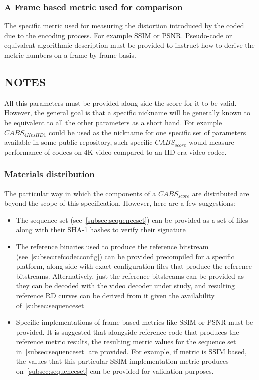 \documentclass[10pt, conference, hidelinks, onecolumn]{IEEEtran}
\begin{document}
\subsubsection{A Frame based metric used for comparison}
\label{subsec:framebasemetric}
The specific metric used for measuring the distortion introduced by the coded due to the encoding process. For example SSIM or PSNR. Pseudo-code or equivalent algorithmic description must be provided to instruct how to derive the metric numbers on a frame by frame basis.

\subsection{NOTES}
All this parameters must be provided along side the score for it to be valid. However, the general goal is that a specific nickname will be generally known to be equivalent to all the other parameters as a short hand. For example $CABS_{4KvsHD1}$ could be used as the nickname for one specific set of parameters available in some public repository, such specific $CABS_{score}$ would measure performance of codecs on 4K video compared to an HD era video codec.

\subsubsection{Materials distribution}
The particular way in which the components of a $CABS_{score}$ are distributed are beyond the scope of this specification. However, here are a few suggestions:

\begin{itemize}
  \item The sequence set (see~\ref{subsec:sequenceset}) can be provided as a set of files along with their SHA-1 hashes\cite{shs} to verify their signature
  \item The reference binaries used to produce the reference bitstream (see~\ref{subsec:refcodecconfig}) can be provided precompiled for a specific platform, along side with exact configuration files that produce the reference bitstreams. Alternatively, just the reference bitstreams can be provided as they can be decoded with the video decoder under study, and resulting reference RD curves can be derived from it given the availability of~\ref{subsec:sequenceset}
  \item Specific implementations of frame-based metrics like SSIM or PSNR must be provided. It is suggested that alongside reference code that produces the reference metric results, the resulting metric values for the sequence set in~\ref{subsec:sequenceset} are provided. For example, if metric is SSIM based, the values that this particular SSIM implementation metric produces on~\ref{subsec:sequenceset} can be provided for validation purposes.
\end{itemize}
\end{document}
